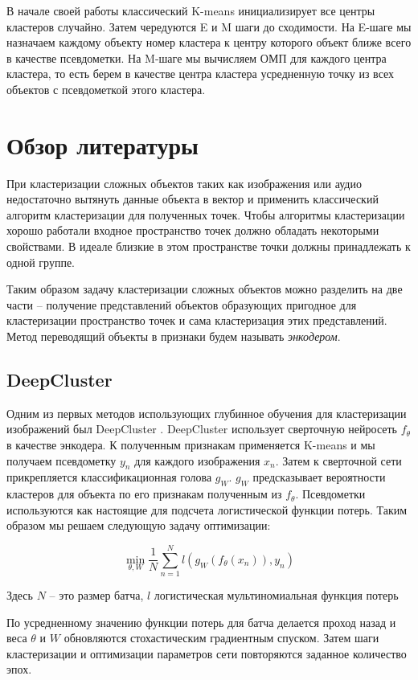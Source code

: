 \documentclass[a4paper,12pt]{extarticle}
\begin{document}
В начале своей работы классический K-means инициализирует все 
центры кластеров случайно. Затем чередуются E и M шаги до 
сходимости. На E-шаге мы назначаем каждому объекту номер
кластера к центру которого объект ближе всего в качестве псевдометки.
На M-шаге мы вычисляем ОМП для каждого центра кластера, то есть 
берем в качестве центра кластера усредненную точку из всех объектов 
с псевдометкой этого кластера.

\section{Обзор литературы}

При кластеризации сложных объектов таких как изображения или 
аудио недостаточно вытянуть данные объекта в вектор и применить
классический алгоритм кластеризации для полученных точек. 
Чтобы алгоритмы кластеризации хорошо работали входное 
пространство точек должно обладать некоторыми свойствами.
В идеале близкие в этом пространстве точки должны принадлежать 
к одной группе.

Таким образом задачу кластеризации сложных объектов можно 
разделить на две части -- получение представлений объектов 
образующих пригодное для кластеризации пространство точек и 
сама кластеризация этих представлений. Метод переводящий объекты
в признаки будем называть \textit{энкодером}.

\subsection{DeepCluster}

Одним из первых методов использующих глубинное обучения для 
кластеризации изображений был
DeepCluster \cite{Caron_2018_ECCV}. DeepCluster использует 
сверточную нейросеть $f_\theta$ в качестве энкодера.
К полученным признакам применяется K-means и мы получаем
псевдометку $y_n$ для каждого изображения $x_n$. Затем к 
сверточной сети прикрепляется
классификационная голова $g_W$. $g_W$ предсказывает 
вероятности кластеров для объекта по его признакам 
полученным из $f_\theta$. Псевдометки используются как настоящие для подсчета логистической 
функции потерь. Таким образом мы решаем следующую задачу 
оптимизации:

\[
	\min_{\theta, W} \frac{1}{N}\sum_{n=1}^N 
	l(g_W(f_\theta(x_n)), y_n)
\]

Здесь $N$ -- это размер батча, $l$ логистическая 
мультиномиальная функция потерь

По усредненному значению функции потерь для батча делается проход назад и веса 
$\theta$ и $W$ обновляются стохастическим градиентным спуском. Затем 
шаги кластеризации и оптимизации параметров сети повторяются 
заданное количество эпох.
\end{document}

